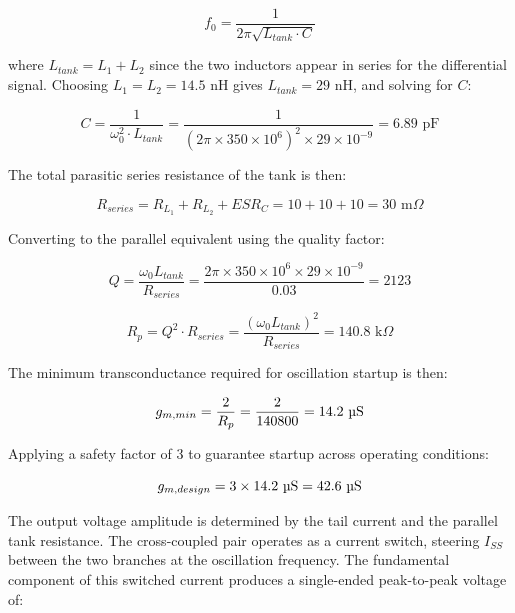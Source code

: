 \documentclass[12pt]{article}
\begin{document}
\begin{equation}
f_0 = \frac{1}{2\pi\sqrt{L_{tank} \cdot C}}
\end{equation}

where $L_{tank} = L_1 + L_2$ since the two inductors appear in series for the differential signal. Choosing $L_1 = L_2 = 14.5 \text{ nH}$ gives $L_{tank} = 29 \text{ nH}$, and solving for $C$:

\begin{equation}
C = \frac{1}{\omega_0^2 \cdot L_{tank}} = \frac{1}{(2\pi \times 350 \times 10^6)^2 \times 29 \times 10^{-9}} = 6.89 \text{ pF}
\end{equation}

The total parasitic series resistance of the tank is then:

\begin{equation}
R_{series} = R_{L_1} + R_{L_2} + ESR_C = 10 + 10 + 10 = 30 \text{ m}\Omega
\end{equation}

Converting to the parallel equivalent using the quality factor:

\begin{equation}
Q = \frac{\omega_0 L_{tank}}{R_{series}} = \frac{2\pi \times 350 \times 10^6 \times 29 \times 10^{-9}}{0.03} = 2123
\end{equation}

\begin{equation}
R_p = Q^2 \cdot R_{series} = \frac{(\omega_0 L_{tank})^2}{R_{series}} = 140.8 \text{ k}\Omega
\end{equation}

The minimum transconductance required for oscillation startup is then:

\begin{equation}
g_{m,min} = \frac{2}{R_p} = \frac{2}{140800} = 14.2 \text{ \textmu S}
\end{equation}

Applying a safety factor of 3 to guarantee startup across operating conditions:

\begin{equation}
g_{m,design} = 3 \times 14.2 \text{ \textmu S} = 42.6 \text{ \textmu S}
\end{equation}

The output voltage amplitude is determined by the tail current and the parallel tank resistance. The cross-coupled pair operates as a current switch, steering $I_{SS}$ between the two branches at the oscillation frequency. The fundamental component of this switched current produces a single-ended peak-to-peak voltage of:
\end{document}
